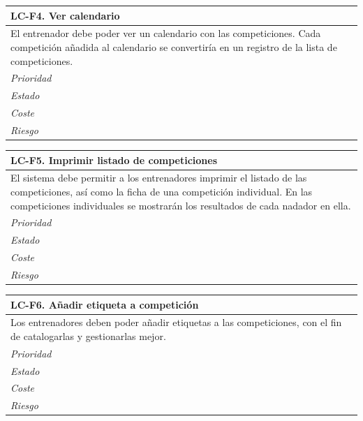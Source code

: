	\begin{center}
		\begin{tabularx}{15cm}{|X|}
			\hline 
				\bf{LC-F4. Ver calendario}\\
			\hline
				El entrenador debe poder ver un calendario con las competiciones. Cada competición añadida al calendario se convertiría en un registro de la lista de competiciones.\\
			\hline
				\it{Prioridad}\\
			\hline
				\it{Estado}\\
			\hline
				\it{Coste}\\
			\hline
				\it{Riesgo}\\
			\hline
		\end{tabularx}
	\end{center}
	
	\begin{center}
		\begin{tabularx}{15cm}{|X|}
			\hline 
				\bf{LC-F5. Imprimir listado de competiciones}\\
			\hline
				El sistema debe permitir a los entrenadores imprimir el listado de las competiciones, así como la ficha de una competición individual. En las competiciones individuales se mostrarán los resultados de cada nadador en ella.\\
			\hline
				\it{Prioridad}\\
			\hline
				\it{Estado}\\
			\hline
				\it{Coste}\\
			\hline
				\it{Riesgo}\\
			\hline
		\end{tabularx}
	\end{center}
	
	\begin{center}
		\begin{tabularx}{15cm}{|X|}
			\hline 
				\bf{LC-F6. Añadir etiqueta a competición}\\
			\hline
				Los entrenadores deben poder añadir etiquetas a las competiciones, con el fin de catalogarlas y gestionarlas mejor.\\
			\hline
				\it{Prioridad}\\
			\hline
				\it{Estado}\\
			\hline
				\it{Coste}\\
			\hline
				\it{Riesgo}\\
			\hline
		\end{tabularx}
	\end{center}
	
